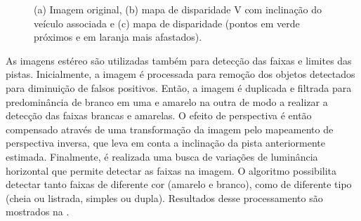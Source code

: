 \begin{figure}[h]
\centering
{}\quad
{}\quad
{}
\caption{(a) Imagem original, (b) mapa de disparidade V com inclinação do veículo associada e (c) mapa de disparidade (pontos em verde próximos e em laranja mais afastados).}%
\label{fig:trinocular_obstacle}%
\end{figure}

As imagens estéreo são utilizadas também para detecção das faixas e limites das pistas. Inicialmente, a imagem é processada para remoção dos objetos detectados para diminuição de falsos positivos. Então, a imagem é duplicada e filtrada para predominância de branco em uma e amarelo na outra de modo a realizar a detecção das faixas brancas e amarelas. O efeito de perspectiva é então compensado através de uma transformação da imagem pelo mapeamento de perspectiva inversa, que leva em conta a inclinação da pista anteriormente estimada. Finalmente, é realizada uma busca de variações de luminância horizontal que permite detectar as faixas na imagem. O algoritmo possibilita detectar tanto faixas de diferente cor (amarelo e branco), como de diferente tipo (cheia ou listrada, simples ou dupla). Resultados desse processamento são mostrados na .

